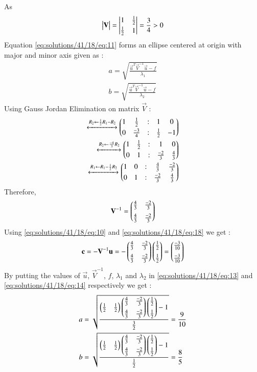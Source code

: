 As
\begin{align}
    \begin{vmatrix}\mathbf{V}\end{vmatrix} =\begin{vmatrix}1&\frac{1}{2}\\[0.1cm]\frac{1}{2}&1\end{vmatrix}=\frac{3}{4}>0
\end{align}
Equation \eqref{eq:solutions/41/18/eq:11} forms an ellipse centered at origin with major and minor axis given as : 
\begin{align}
    a=\sqrt{\frac{\vec{u}^T\vec{V}^{-1}\vec{u}-f}{\lambda_1}}\label{eq:solutions/41/18/eq:13}\\
    b=\sqrt{\frac{\vec{u}^T\vec{V}^{-1}\vec{u}-f}{\lambda_2}}\label{eq:solutions/41/18/eq:14}
\end{align} 
Using Gauss Jordan Elimination on matrix $\vec{V}$ : 
\begin{align}
 \xleftrightarrow{R_2 \leftarrow \frac{1}{2} R_1-R_2}\begin{pmatrix}1&\frac{1}{2}&:&1&0\\[0.1cm]0&\frac{-3}{4}&:&\frac{1}{2}&-1\end{pmatrix}\\
 \xleftrightarrow{R_2 \leftarrow \frac{-4}{3} R_2}\begin{pmatrix}1&\frac{1}{2}&:&1&0\\[0.1cm]0&1&:&\frac{-2}{3}&\frac{4}{3}\end{pmatrix}\\
 \xleftrightarrow{R_1 \leftarrow R_1-\frac{1}{2} R_2}\begin{pmatrix}1&0&:&\frac{4}{3}&\frac{-2}{3}\\[0.1cm]0&1&:&\frac{-2}{3}&\frac{4}{3}\end{pmatrix}
 \end{align}
 Therefore,
 \begin{align}
 \mathbf{V}^{-1}=\begin{pmatrix}\frac{4}{3}&\frac{-2}{3}\\[0.2cm]\frac{4}{3}&\frac{-2}{3}\end{pmatrix}\label{eq:solutions/41/18/eq:18}
\end{align}
Using \eqref{eq:solutions/41/18/eq:10} and \eqref{eq:solutions/41/18/eq:18} we get : 
\begin{align}
    \mathbf{c}=-\mathbf{V}^{-1}\mathbf{u}=-\begin{pmatrix}\frac{4}{3}&\frac{-2}{3}\\[0.2cm]\frac{4}{3}&\frac{-2}{3}\end{pmatrix}\begin{pmatrix}\frac{1}{2}\\[0.2cm]\frac{1}{2}\end{pmatrix}=\begin{pmatrix}\frac{-3}{10}\\[0.2cm]\frac{-3}{10}\end{pmatrix}
\end{align}
By putting the values of $\vec{u}$, $\vec{V}^{-1}$, $f$, $\lambda_1$ and $\lambda_2$ in \eqref{eq:solutions/41/18/eq:13} and \eqref{eq:solutions/41/18/eq:14} respectively we get :   
\begin{align}
    a&=\sqrt{\frac{\begin{pmatrix}\frac{1}{2}&\frac{1}{2}\end{pmatrix}\begin{pmatrix}\frac{4}{3}&\frac{-2}{3}\\[0.2cm]\frac{4}{3}&\frac{-2}{3}\end{pmatrix}\begin{pmatrix}\frac{1}{2}\\[0.2cm]\frac{1}{2}\end{pmatrix}-1}{\frac{3}{2}}}=\frac{9}{10}\\
    b&=\sqrt{\frac{\begin{pmatrix}\frac{1}{2}&\frac{1}{2}\end{pmatrix}\begin{pmatrix}\frac{4}{3}&\frac{-2}{3}\\[0.2cm]\frac{4}{3}&\frac{-2}{3}\end{pmatrix}\begin{pmatrix}\frac{1}{2}\\[0.2cm]\frac{1}{2}\end{pmatrix}-1}{\frac{1}{2}}}=\frac{8}{5}
\end{align}

